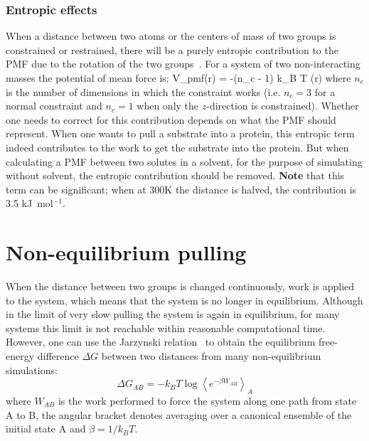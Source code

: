 \subsubsection{Entropic effects}
When a distance between two atoms or the centers of mass of two groups
is constrained or restrained, there will be a purely entropic contribution
to the PMF due to the rotation of the two groups~\cite{RMNeumann1980a}.
For a system of two non-interacting masses the potential of mean force is:
\beq
V_{pmf}(r) = -(n_c - 1) k_B T \log(r)
\eeq
where $n_c$ is the number of dimensions in which the constraint works
(i.e. $n_c=3$ for a normal constraint and $n_c=1$ when only
the $z$-direction is constrained).
Whether one needs to correct for this contribution depends on what
the PMF should represent. When one wants to pull a substrate
into a protein, this entropic term indeed contributes to the work to
get the substrate into the protein. But when calculating a PMF
between two solutes in a solvent, for the purpose of simulating
without solvent, the entropic contribution should be removed.
{\bf Note} that this term can be significant; when at 300K the distance is halved,
the contribution is 3.5 kJ~mol$^{-1}$.

\section{Non-equilibrium pulling}
When the distance between two groups is changed continuously,
work is applied to the system, which means that the system is no longer
in equilibrium. Although in the limit of very slow pulling
the system is again in equilibrium, for many systems this limit
is not reachable within reasonable computational time.
However, one can use the Jarzynski relation~\cite{Jarzynski1997a}
to obtain the equilibrium free-energy difference $\Delta G$
between two distances from many non-equilibrium simulations:
\begin{equation}
   \Delta G_{AB} = -k_BT \log \left\langle e^{-\beta W_{AB}} \right\rangle_A
   \label{eq:Jarz}
\end{equation}
where $W_{AB}$ is the work performed to force the system along one path
from state A to B, the angular bracket denotes averaging over
a canonical ensemble of the initial state A and $\beta=1/k_B T$.


